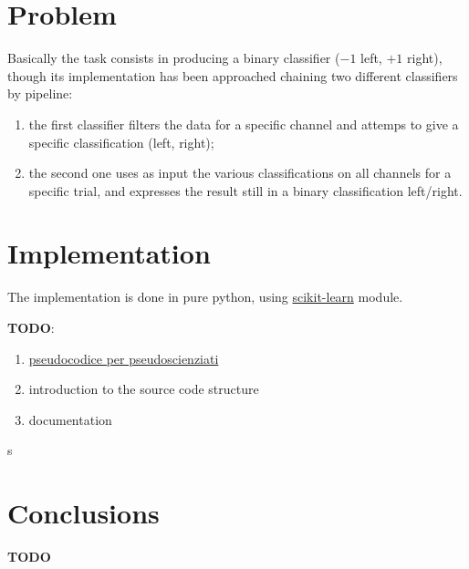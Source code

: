 \documentclass[10pt]{article}
\begin{document}
\section{Problem}
Basically the task consists in producing a binary classifier ($-1$ left, $+1$ right), though its implementation has been approached chaining two different classifiers by pipeline:
\begin{enumerate}
\item the first classifier filters the data for a specific channel and attemps to give a specific classification (left, right); 
\item the second one uses as input the various classifications on all channels for a specific trial, and expresses the result still in a binary classification left/right.
\end{enumerate}



\section{Implementation}
The implementation is done in pure python, using \href{http://scikit-learn.org/stable/}{scikit-learn} module. 

\vspace{10in}
\textbf{TODO}:
\begin{enumerate}
\item  \href{https://en.wikibooks.org/wiki/LaTeX/Algorithms_and_Pseudocode}{pseudocodice per pseudoscienziati}
\item introduction to the source code structure
\item documentation
\end{enumerate}

s

\section{Conclusions}
\textbf{TODO}
\end{document}
